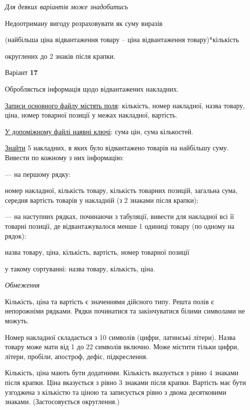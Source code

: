 \documentclass[11pt, ukrainian]{article}
\begin{document}
\bigskip\textit{Для деяких варіантів може знадобитись}

Недоотриману вигоду розраховувати як суму виразів
{\center (найбільша ціна відвантаження товару – ціна відвантаження товару)*кількість\par}

\bigskip
{\noindent} округлених до 2 знаків після крапки.


\par
\newpage
{\center Варіант  \No \textbf { 17 }\par}
\bigskip
Обробляється інформація щодо відвантажених накладних.

\underline{Записи основного файлу містять поля}: кількість, номер накладної, назва товару, ціна, номер товарної позиції у межах накладної, вартість.

\underline{У допоміжному файлі наявні ключі}: сума цін, сума кількостей.

\underline{Знайти} 5 накладних, в яких було відвантажено товарів на найбільшу суму. Вивести по кожному з них інформацію:\par
{\noindent}--- на першому рядку:\par
номер накладної, кількість товару, кількість товарних позицій, загальна сума, середня вартість товарів у накладній (з 2 знаками після крапки);

{\noindent}--- на наступних рядках, починаючи з табуляції, вивести для накладної всі її товарні позиції, де відвантажувалося менше 1 одиниці товару (по одному на рядок):\par
назва товару, ціна, кількість, вартість, номер товарної позиції

{\noindent}у такому сортуванні: назва товару, кількість, ціна.


\bigskip\textit{Обмеження}

Кількість, ціна та вартість є значеннями дійсного типу.
Решта полів є непорожніми рядками.
Рядки починатися та закінчуватися білими символами не можуть.

Номер накладної складається з 10 символів (цифри, латинські літери).
Назва товару може мати від 1 до 22 символів включно.
Може містити тільки цифри, літери, пробіли, апостроф, дефіс, підкреслення.

Кількість, ціна мають бути додатними.
Кількість вказується з рівно 4 знаками після крапки.
Ціна вказується з рівно 3 знаками після крапки.
Вартість має бути узгоджена з кількістю та ціною та записується рівно з двома десятковими знаками.
(Застосовується округлення.)
\end{document}
